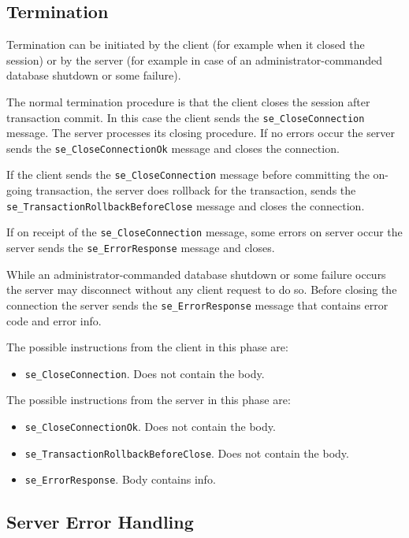 \documentclass[a4paper,12pt]{article}
\begin{document}
\subsection{Termination}
Termination can be initiated by the client (for example when it closed the session) or by the server (for example in case of an administrator-commanded database shutdown or some failure).

The normal termination procedure is that the client closes the session after transaction commit. In this case the client sends the \verb!se_CloseConnection! message. The server processes its closing procedure. If no errors occur the server sends the \verb!se_CloseConnectionOk! message and closes the connection.

If the client sends the \verb!se_CloseConnection! message before committing the on-going transaction, the server does rollback for the transaction, sends the \verb!se_TransactionRollbackBeforeClose! message and closes the connection.

If on receipt of the \verb!se_CloseConnection! message, some errors on server occur the server sends the \verb!se_ErrorResponse! message and closes.

While an administrator-commanded database shutdown or some failure occurs the server may disconnect without any client request to do so. Before closing the connection the server sends the \verb!se_ErrorResponse! message that contains error code and error info.

The possible instructions from the client in this phase are:
\begin{itemize}
\item \verb!se_CloseConnection!. Does not contain the body.
\end{itemize}

The possible instructions from the server in this phase are:
\begin{itemize}
\item \verb!se_CloseConnectionOk!. Does not contain the body.
\item \verb!se_TransactionRollbackBeforeClose!. Does not contain the body.
\item \verb!se_ErrorResponse!. Body contains info.
\end{itemize}

\subsection{Server Error Handling}
\end{document}
